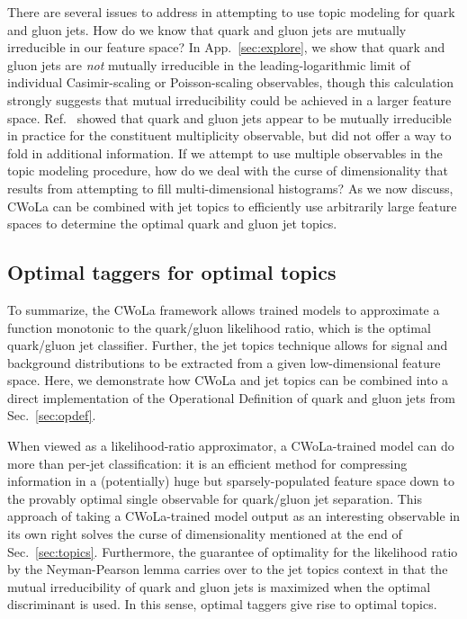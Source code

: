 \documentclass[letterpaper,11pt]{article}
\DeclareRobustCommand{\Sec}[1]{Sec.~\ref{#1}}
\DeclareRobustCommand{\App}[1]{App.~\ref{#1}}
\DeclareRobustCommand{\Ref}[1]{Ref.~\cite{#1}}
\begin{document}
There are several issues to address in attempting to use topic modeling for quark and gluon jets.
%
How do we know that quark and gluon jets are mutually irreducible in our feature space?
%
In \App{sec:explore}, we show that quark and gluon jets are {\it not} mutually irreducible in the leading-logarithmic limit of individual Casimir-scaling or Poisson-scaling observables, though this calculation strongly suggests that mutual irreducibility could be achieved in a larger feature space.
%
\Ref{Metodiev:2018ftz} showed that quark and gluon jets appear to be mutually irreducible in practice for the constituent multiplicity observable, but did not offer a way to fold in additional information.
%
If we attempt to use multiple observables in the topic modeling procedure, how do we deal with the curse of dimensionality that results from attempting to fill multi-dimensional histograms?
%
As we now discuss, CWoLa can be combined with jet topics to efficiently use arbitrarily large feature spaces to determine the optimal quark and gluon jet topics.



\subsection{Optimal taggers for optimal topics}
\label{sec:optimal}


To summarize, the CWoLa framework allows trained models to approximate a function monotonic to the quark/gluon likelihood ratio, which is the optimal quark/gluon jet classifier.
%
Further, the jet topics technique allows for signal and background distributions to be extracted from a given low-dimensional feature space.
%
Here, we demonstrate how CWoLa and jet topics can be combined into a direct implementation of the Operational Definition of quark and gluon jets from \Sec{sec:opdef}.


When viewed as a likelihood-ratio approximator, a CWoLa-trained model can do more than per-jet classification: it is an efficient method for compressing information in a (potentially) huge but sparsely-populated feature space down to the provably optimal single observable for quark/gluon jet separation.
%
This approach of taking a CWoLa-trained model output as an interesting observable in its own right solves the curse of dimensionality mentioned at the end of \Sec{sec:topics}.
%
Furthermore, the guarantee of optimality for the likelihood ratio by the Neyman-Pearson lemma carries over to the jet topics context in that the mutual irreducibility of quark and gluon jets is maximized when the optimal discriminant is used. 
%
In this sense, optimal taggers give rise to optimal topics.
\end{document}
